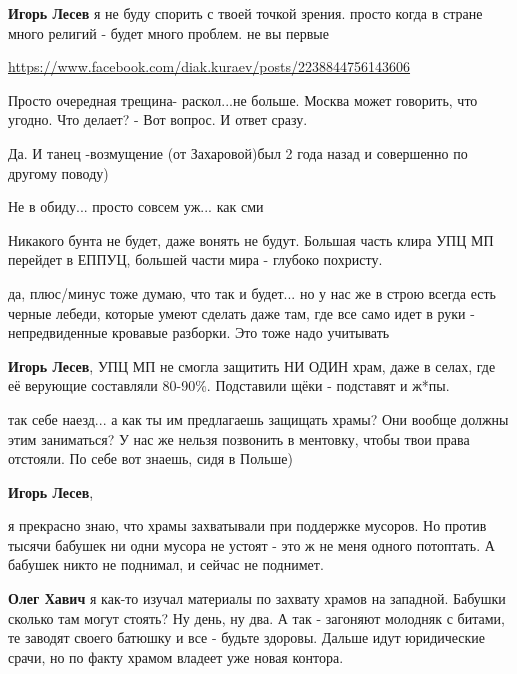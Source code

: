 \begin{itemize}
\begin{itemize}
\textbf{Игорь Лесев} я не буду спорить с твоей точкой зрения. просто когда в стране много религий - будет много проблем. не вы первые
\end{itemize} %

\url{https://www.facebook.com/diak.kuraev/posts/2238844756143606}

Просто очередная трещина- раскол...не больше.
Москва может говорить, что угодно. Что делает? - Вот вопрос.
И ответ сразу.

\begin{itemize} %
Да. И танец -возмущение (от Захаровой)был 2 года назад и совершенно по другому поводу)

Не в обиду... просто совсем уж... как сми
\end{itemize} %


Никакого бунта не будет, даже вонять не будут. Большая часть клира УПЦ МП
перейдет в ЕППУЦ, большей части мира - глубоко похристу.

\begin{itemize} %

да, плюс/минус тоже думаю, что так и будет... но у нас же в строю всегда есть
черные лебеди, которые умеют сделать даже там, где все само идет в руки -
непредвиденные кровавые разборки. Это тоже надо учитывать

\textbf{Игорь Лесев}, УПЦ МП не смогла защитить НИ ОДИН храм, даже в селах, где её верующие составляли 80-90\%. Подставили щёки - подставят и ж*пы.


так себе наезд... а как ты им предлагаешь защищать храмы? Они вообще должны
этим заниматься? У нас же нельзя позвонить в ментовку, чтобы твои права
отстояли. По себе вот знаешь, сидя в Польше)

\textbf{Игорь Лесев}, 

я прекрасно знаю, что храмы захватывали при поддержке мусоров. Но против тысячи
бабушек ни одни мусора не устоят - это ж не меня одного потоптать. А бабушек
никто не поднимал, и сейчас не поднимет.

\textbf{Олег Хавич} я как-то изучал материалы по захвату храмов на западной. Бабушки сколько там могут стоять? Ну день, ну два. А так - загоняют молодняк с битами, те заводят своего батюшку и все - будьте здоровы. Дальше идут юридические срачи, но по факту храмом владеет уже новая контора.


\end{itemize}
\end{itemize}

